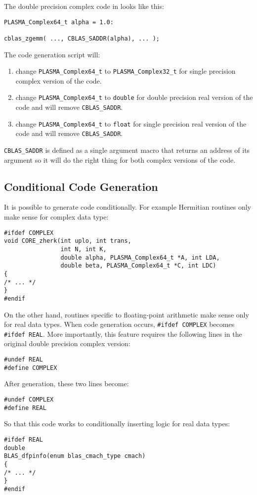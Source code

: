 The double precision complex code in \PLASMA looks like this:
\begin{verbatim}
PLASMA_Complex64_t alpha = 1.0:

cblas_zgemm( ..., CBLAS_SADDR(alpha), ... );
\end{verbatim}
The code generation script will:
\begin{enumerate}
\item change \texttt{PLASMA\_Complex64\_t} to \texttt{PLASMA\_Complex32\_t}
for single precision complex version of the code.
\item change \texttt{PLASMA\_Complex64\_t} to \texttt{double}
for double precision real version of the code and will remove \texttt{CBLAS\_SADDR}.
\item change \texttt{PLASMA\_Complex64\_t} to \texttt{float}
for single precision real version of the code and will remove \texttt{CBLAS\_SADDR}.
\end{enumerate}

\texttt{CBLAS\_SADDR} is defined as a single argument macro that returns an address
of its argument so it will do the right thing for both complex versions of the code.

\subsection{Conditional Code Generation}
It is possible to generate code conditionally. For example Hermitian routines
only make sense for complex data type:
\begin{verbatim}
#ifdef COMPLEX
void CORE_zherk(int uplo, int trans,
                int N, int K,
                double alpha, PLASMA_Complex64_t *A, int LDA,
                double beta, PLASMA_Complex64_t *C, int LDC)
{
/* ... */
}
#endif
\end{verbatim}

On the other hand, routines specific to floating-point arithmetic make
sense only for real data types. When code generation occurs, {\tt \#ifdef COMPLEX}
becomes {\tt \#ifdef REAL}.  More importantly, this feature requires the following
lines in the original double precision complex version:
\begin{verbatim}
#undef REAL
#define COMPLEX
\end{verbatim}
After generation, these two lines become:
\begin{verbatim}
#undef COMPLEX
#define REAL
\end{verbatim}
So that this code works to conditionally inserting logic for real data types:
\begin{verbatim}
#ifdef REAL
double
BLAS_dfpinfo(enum blas_cmach_type cmach)
{
/* ... */
}
#endif
\end{verbatim}

